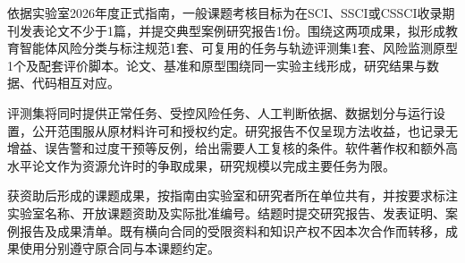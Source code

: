 依据实验室2026年度正式指南，一般课题考核目标为在SCI、SSCI或CSSCI收录期刊发表论文不少于1篇，并提交典型案例研究报告1份。围绕这两项成果，拟形成教育智能体风险分类与标注规范1套、可复用的任务与轨迹评测集1套、风险监测原型1个及配套评价脚本。论文、基准和原型围绕同一实验主线形成，研究结果与数据、代码相互对应。

评测集将同时提供正常任务、受控风险任务、人工判断依据、数据划分与运行设置，公开范围服从原材料许可和授权约定。研究报告不仅呈现方法收益，也记录无增益、误告警和过度干预等反例，给出需要人工复核的条件。软件著作权和额外高水平论文作为资源允许时的争取成果，研究规模以完成主要任务为限。

获资助后形成的课题成果，按指南由实验室和研究者所在单位共有，并按要求标注实验室名称、开放课题资助及实际批准编号。结题时提交研究报告、发表证明、案例报告及成果清单。既有横向合同的受限资料和知识产权不因本次合作而转移，成果使用分别遵守原合同与本课题约定。
